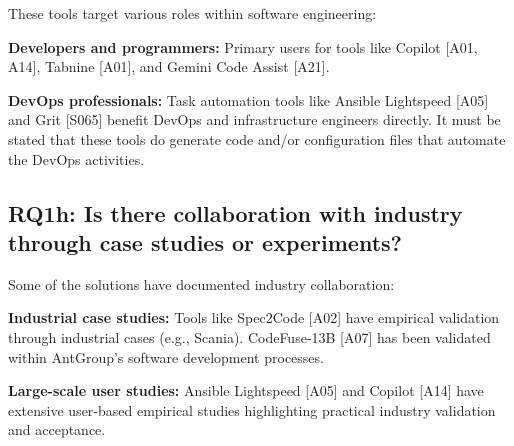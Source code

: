 These tools target various roles within software engineering:

\textbf{Developers and programmers:} Primary users for tools like Copilot [A01, A14], Tabnine [A01], and Gemini Code Assist [A21].


\textbf{DevOps professionals:} Task automation tools like Ansible Lightspeed [A05] and Grit [S065] benefit DevOps and infrastructure engineers directly. It must be stated that these tools do generate code and/or configuration files that automate the DevOps activities.

\subsection{RQ1h: Is there collaboration with industry through case studies or experiments?}

Some of the solutions have documented industry collaboration:

\textbf{Industrial case studies:} Tools like Spec2Code [A02] have empirical validation through industrial cases (e.g., Scania). CodeFuse-13B [A07] has been validated within AntGroup's software development processes.

\textbf{Large-scale user studies:} Ansible Lightspeed [A05] and Copilot [A14] have extensive user-based empirical studies highlighting practical industry validation and acceptance.




